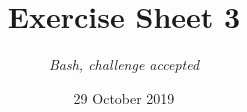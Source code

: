 




\title{{\vspace{-12mm}\huge\textbf{Exercise Sheet 3}}}
\author{\textit{Bash, challenge accepted}}
\date{{\small 29 October 2019}}


    \maketitle
    \bigskip
    
    \bigskip
    
